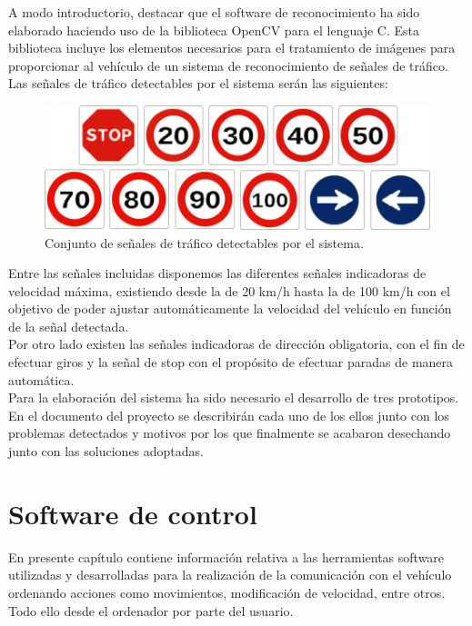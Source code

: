 \documentclass[a4paper,12pt]{article}
\begin{document}
A modo introductorio, destacar que el software de reconocimiento ha sido elaborado haciendo uso de la biblioteca OpenCV para el lenguaje C. Esta biblioteca incluye los elementos necesarios para el tratamiento de imágenes para proporcionar al vehículo de un sistema de reconocimiento de señales de tráfico.\\

Las señales de tráfico detectables por el sistema serán las siguientes:\\

\begin{figure}[H]
  \begin{center}
    \includegraphics[scale=0.7]{imagenes/seniales2.png}
  \end{center}
  \caption{Conjunto de señales de tráfico detectables por el sistema.}
  \label{conjunto-señales-rp}
\end{figure}

Entre las señales incluidas disponemos las diferentes señales indicadoras de velocidad máxima, existiendo desde la de 20 km/h hasta la de 100 km/h con el objetivo de poder ajustar automáticamente la velocidad del vehículo en función de la señal detectada.\\

Por otro lado existen las señales indicadoras de dirección obligatoria, con el fin de efectuar giros y la señal de stop con el propósito de efectuar paradas de manera automática.\\

Para la elaboración del sistema ha sido necesario el desarrollo de tres prototipos. En el documento del proyecto se describirán cada uno de los ellos junto con los problemas detectados y motivos por los que finalmente se acabaron desechando junto con las soluciones adoptadas.


\section{Software de control}

En presente capítulo contiene información relativa a las herramientas software utilizadas y desarrolladas para la realización de la comunicación con el vehículo ordenando acciones como movimientos, modificación de velocidad, entre otros. Todo ello desde el ordenador por parte del usuario.\\
\end{document}
